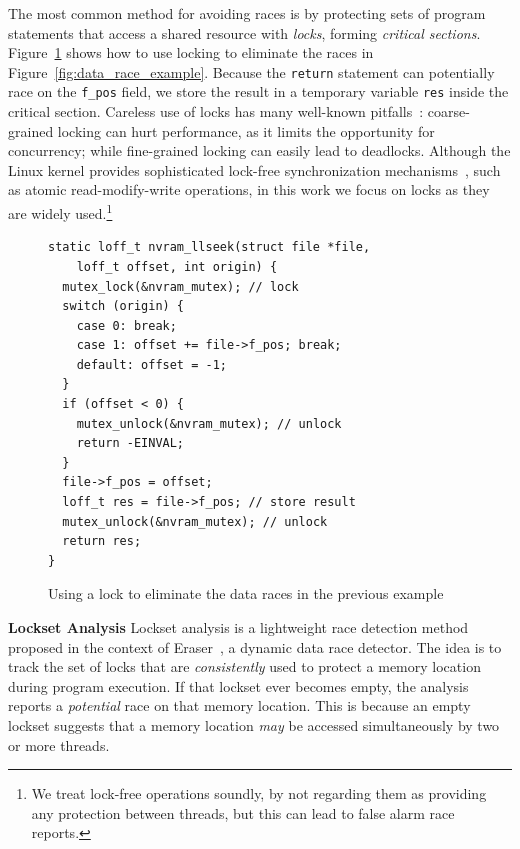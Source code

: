 The most common method for avoiding races is by protecting sets of program statements that access a shared resource with \emph{locks}, forming \emph{critical sections}.  Figure~\ref{fig:lock_example} shows how to use locking to eliminate the races in Figure~\ref{fig:data_race_example}. Because the \texttt{return} statement can potentially race on the \texttt{f\_pos} field, we store the result in a temporary variable \texttt{res} inside the critical section.
%
Careless use of locks has many well-known pitfalls~\cite{sutter2005software}: coarse-grained locking can hurt performance, as it limits the opportunity for concurrency; while fine-grained locking can easily lead to deadlocks. Although the Linux kernel provides sophisticated lock-free synchronization mechanisms~\cite[p.\ 123]{corbet2005linux}, such as atomic read-modify-write operations, in this work we focus on locks as they are widely used.\footnote{We treat lock-free operations soundly, by not regarding them as providing any protection between threads, but this can lead to false alarm race reports.}

\begin{figure}[t]
\begin{lstlisting}
static loff_t nvram_llseek(struct file *file,
    loff_t offset, int origin) {
  mutex_lock(&nvram_mutex); // lock
  switch (origin) {
    case 0: break;
    case 1: offset += file->f_pos; break;
    default: offset = -1;
  }
  if (offset < 0) {
    mutex_unlock(&nvram_mutex); // unlock
    return -EINVAL;
  }
  file->f_pos = offset;
  loff_t res = file->f_pos; // store result
  mutex_unlock(&nvram_mutex); // unlock
  return res;
}
\end{lstlisting}
\vspace{-2mm}
\caption{Using a lock to eliminate the data races in the previous example}
\label{fig:lock_example}
\vspace{-2mm}
\end{figure}

\noindent\textbf{Lockset Analysis }
%
Lockset analysis is a lightweight race detection method proposed in the context of Eraser~\cite{savage1997eraser}, a dynamic data race detector.  The idea is to track the set of locks that are \emph{consistently} used to protect a memory location during program execution. If that lockset ever becomes empty, the analysis reports a \emph{potential} race on that memory location. This is because an empty lockset suggests that a memory location \emph{may} be accessed simultaneously by two or more threads.  

